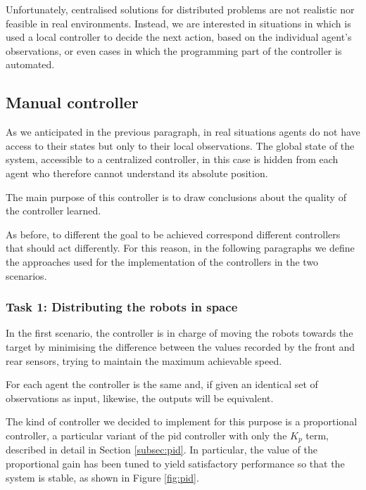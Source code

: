 Unfortunately, centralised solutions for distributed problems are not realistic nor 
feasible in real environments. 
Instead, we are interested in situations in which is used a local controller to decide 
the next action, based on the individual agent's observations, or even cases in 
which the programming part of the controller is automated.

\subsection{Manual controller}
\label{subsec:manual}
As we anticipated in the previous paragraph, in real situations agents do not have 
access to their states but only to their local observations. The global state of the 
system, accessible to a centralized controller, in this case is hidden from each 
agent who therefore cannot understand its absolute position.

The main purpose of this controller is to draw conclusions about the quality of the 
controller learned.

As before, to different the goal to be achieved correspond different controllers 
that should act differently. For this reason, in the following paragraphs we define 
the approaches used for the implementation of the controllers in the two 
scenarios.

\subsubsection{Task 1: Distributing the robots in space}
In the first scenario, the controller is in charge of moving the robots towards the 
target by minimising the difference between the values recorded by the front and 
rear sensors, trying to maintain the maximum achievable speed.

For each agent the controller is the same and, if given an identical set of 
observations as input, likewise, the outputs will be equivalent.

The kind of controller we decided to implement for this purpose is a proportional 
controller, a particular variant of the \gls{pid} controller with only the $K_p$ 
term, described in detail in Section \ref{subsec:pid}. 
In particular, the value of the proportional gain has been tuned to yield 
satisfactory performance so that the system is stable, as shown in Figure 
\ref{fig:pid}. 

